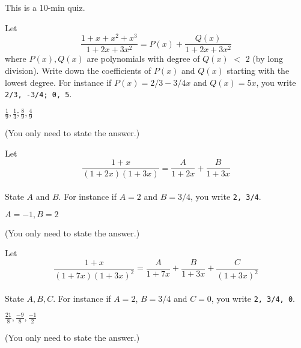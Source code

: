 

\renewcommand\AUTHOR{nweadick1@cougars.ccis.edu} %


\topmattertwo

This is a 10-min quiz.

\nextq
Let
\[
\frac{1 + x + x^2 + x^3}{1 + 2x + 3x^2}
= P(x) + \frac{Q(x)}{1 + 2x + 3x^2}
\]
where $P(x), Q(x)$ are polynomials with degree of $Q(x)$ $<$ $2$
(by long division).
Write down the coefficients of $P(x)$ and $Q(x)$
starting with the lowest degree.
For instance if $P(x) = 2/3 - 3/4x$ and $Q(x) = 5x$, you write
\verb!2/3, -3/4; 0, 5!.
\\
\ANSWER
\begin{answerlong}
$\frac{1}{9},\frac{1}{3};\frac{8}{9},\frac{4}{9}$
\end{answerlong}
(You only need to state the answer.)

\nextq
Let
\[
\frac{1 + x}{(1 + 2x)(1 + 3x)} = \frac{A}{1+2x} + \frac{B}{1 + 3x}
\]
\\
State $A$ and $B$.
For instance if $A = 2$ and $B = 3/4$, you write
\verb!2, 3/4!.

\ANSWER
\begin{answerlong}
$A=-1,B=2$
\end{answerlong}
(You only need to state the answer.)

\nextq
Let
\[
\frac{1 + x}{(1 + 7x)(1 + 3x)^2} = \frac{A}{1+7x} + \frac{B}{1 + 3x} + \frac{C}{(1 + 3x)^2}
\]
\\
State $A, B, C$.
For instance if $A = 2$, $B = 3/4$ and $C = 0$, you write
\verb!2, 3/4, 0!.

\ANSWER
\begin{answerlong}
$\frac{21}{8},\frac{-9}{8},\frac{-1}{2}$
\end{answerlong}
(You only need to state the answer.)

\newpage


